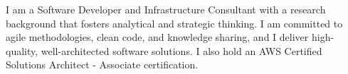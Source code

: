 \documentclass[9pt]{developercv} %
\begin{document}
	\begin{minipage}[t]{0.4\textwidth}
	    \vspace{-\baselineskip} %

	I am a Software Developer and Infrastructure Consultant with a research background that fosters analytical and strategic thinking. I am committed to agile methodologies, clean code, and knowledge sharing, and I deliver high-quality, well-architected software solutions. I also hold an AWS Certified Solutions Architect - Associate certification.
	\end{minipage}
	\hfill
	\begin{minipage}[t]{0.2\textwidth}
		\vspace{-\baselineskip} %
        \vspace{-1cm}

		\begin{barchart}{5.5}
		\end{barchart}
	\end{minipage}
	

	
\end{document}
